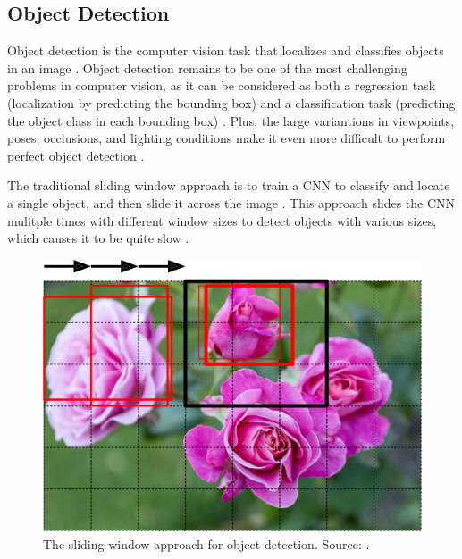 \documentclass[a4paper, 11pt, oneside]{article}
\begin{document}
  \subsection{Object Detection}

  \label{sec:objectdetection}

  Object detection is the computer vision task that localizes and classifies objects in an image
  \cite{elgendy2020deep, zhao2019object, liu2020deep, geron2019hands}. Object detection remains to be one of the most
  challenging problems in computer vision, as it can be considered as both a regression task (localization by predicting
  the bounding box) and a classification task (predicting the object class in each bounding box)
  \cite{elgendy2020deep, girshick2014rich, geron2019hands}. Plus, the large variantions in viewpoints, poses, occlusions,
  and lighting conditions make it even more difficult to perform perfect object detection
  \cite{zhao2019object, liu2020deep}.

  The traditional sliding window approach is to train a CNN to classify and locate a single object, and then slide it
  across the image \cite{geron2019hands, pasquet2017amphora, girshick2014rich, redmon2016you}. This approach slides the
  CNN mulitple times with different window sizes to detect objects with various sizes, which causes it to be quite slow
  \cite{geron2019hands}.

  \begin{figure}[ht]
    \begin{center}
      \includegraphics[width=.8\textwidth]{sliding_window.png}
    \end{center}
    \caption{The sliding window approach for object detection. Source: \cite{o2019deep}.}
  \end{figure}
\end{document}
